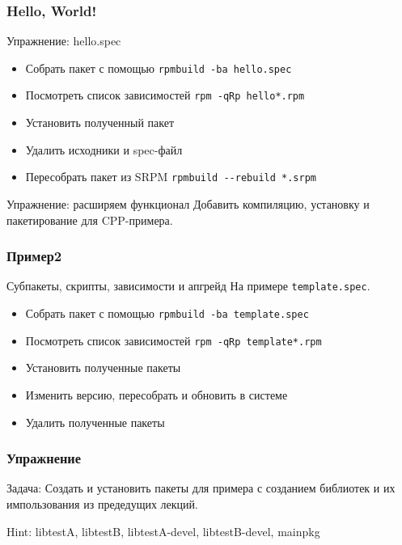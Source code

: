 \begin{frame}
	\frametitle{Hello, World!}

	\begin{block}{Упражнение: hello.spec}
		\begin{itemize}
			\item Собрать пакет с помощью {\tt rpmbuild -ba hello.spec}
			\item Посмотреть список зависимостей {\tt rpm -qRp hello*.rpm}
			\item Установить полученный пакет
			\item Удалить исходники и spec-файл
			\item Пересобрать пакет из SRPM {\tt rpmbuild -{}-rebuild *.srpm}
		\end{itemize}
	\end{block}

	\pause

	\begin{block}{Упражнение: расширяем функционал}
		Добавить компиляцию, установку и пакетирование для CPP-примера.
	\end{block}

\end{frame}

\begin{frame}
	\frametitle{Пример2}


	\begin{block}{Субпакеты, скрипты, зависимости и апгрейд}
		На примере {\tt template.spec}.

		\begin{itemize}
			\item Собрать пакет с помощью {\tt rpmbuild -ba template.spec}
			\item Посмотреть список зависимостей {\tt rpm -qRp template*.rpm}
			\item Установить полученные пакеты
			\item Изменить версию, пересобрать и обновить в системе
			\item Удалить полученные пакеты
		\end{itemize}
	\end{block}
\end{frame}

\begin{frame}
	\frametitle{Упражнение}

	\begin{block}{Задача:}
		Создать и установить пакеты для примера с созданием библиотек
		и их импользования из предедущих лекций.
	\end{block}

	Hint: libtestA, libtestB, libtestA-devel, libtestB-devel, mainpkg

\end{frame}

